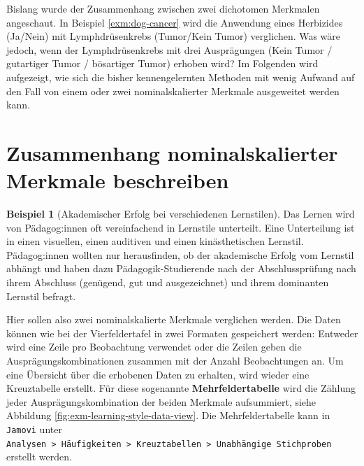 \documentclass[
]{book}
\theoremstyle{definition}
\theoremstyle{definition}
\newtheorem{example}{Beispiel}[chapter]
\theoremstyle{definition}
\theoremstyle{definition}
\theoremstyle{remark}
\begin{document}
Bislang wurde der Zusammenhang zwischen zwei dichotomen Merkmalen angeschaut. In Beispiel \ref{exm:dog-cancer} wird die Anwendung eines Herbizides (Ja/Nein) mit Lymphdrüsenkrebs (Tumor/Kein Tumor) verglichen. Was wäre jedoch, wenn der Lymphdrüsenkrebs mit drei Ausprägungen (Kein Tumor / gutartiger Tumor / bösartiger Tumor) erhoben wird? Im Folgenden wird aufgezeigt, wie sich die bisher kennengelernten Methoden mit wenig Aufwand auf den Fall von einem oder zwei nominalskalierter Merkmale ausgeweitet werden kann.

\section{Zusammenhang nominalskalierter Merkmale beschreiben}\label{zusammenhang-nominalskalierter-merkmale-beschreiben}

\begin{example}[Akademischer Erfolg bei verschiedenen Lernstilen]
\protect\hypertarget{exm:learning-style}{}\label{exm:learning-style}Das Lernen wird von Pädagog:innen oft vereinfachend in Lernstile unterteilt. Eine Unterteilung ist in einen visuellen, einen auditiven und einen kinästhetischen Lernstil. Pädagog:innen wollten nur herausfinden, ob der akademische Erfolg vom Lernstil abhängt und haben dazu Pädagogik-Studierende nach der Abschlussprüfung nach ihrem Abschluss (genügend, gut und ausgezeichnet) und ihrem dominanten Lernstil befragt.
\end{example}

Hier sollen also zwei nominalskalierte Merkmale verglichen werden. Die Daten können wie bei der Vierfeldertafel in zwei Formaten gespeichert werden: Entweder wird eine Zeile pro Beobachtung verwendet oder die Zeilen geben die Ausprägungskombinationen zusammen mit der Anzahl Beobachtungen an. Um eine Übersicht über die erhobenen Daten zu erhalten, wird wieder eine Kreuztabelle erstellt. Für diese sogenannte \textbf{Mehrfeldertabelle} wird die Zählung jeder Ausprägungskombination der beiden Merkmale aufsummiert, siehe Abbildung \ref{fig:exm-learning-style-data-view}. Die Mehrfeldertabelle kann in \texttt{Jamovi} unter \texttt{Analysen\ \textgreater{}\ Häufigkeiten\ \textgreater{}\ Kreuztabellen\ \textgreater{}\ Unabhängige\ Stichproben} erstellt werden.
\end{document}
